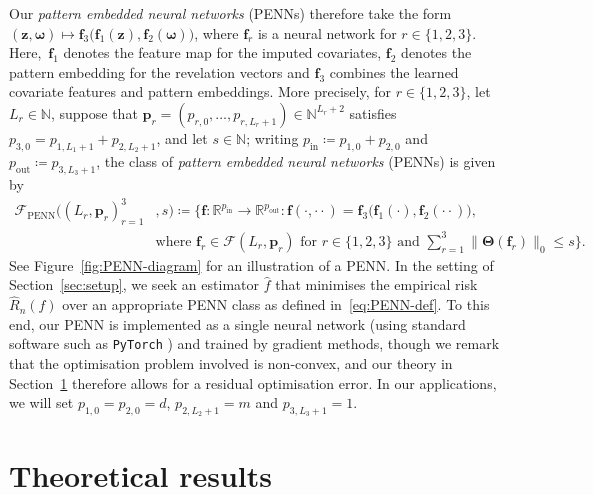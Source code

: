 \documentclass[12pt]{article}
\def\hat{\widehat}
\begin{document}
Our \emph{pattern embedded neural networks} (PENNs) therefore take the form $(\bm z,\bm \omega) \mapsto \bm f_3\bigl(\bm f_1(\bm z), \bm f_2(\bm\omega)\bigr)$, where $\bm f_r$ is a neural network for $r \in \{1,2,3\}$.  Here,~$\bm f_1$ denotes the feature map for the imputed covariates, $\bm f_2$ denotes the pattern embedding  for the revelation vectors and $\bm f_3$ combines the learned covariate features and pattern embeddings.  More precisely, for $r \in \{1,2,3\}$, let $L_r \in \mathbb{N}$, suppose that $\bm p_r = (p_{r,0},\ldots,p_{r,L_r+1}) \in \mathbb{N}^{L_r+2}$ satisfies $p_{3,0} = p_{1,L_1+1} + p_{2,L_2+1}$, and let $s\in\mathbb{N}$; writing $p_{\mathrm{in}} \coloneqq p_{1,0} + p_{2,0}$ and $p_{\mathrm{out}} \coloneqq p_{3,L_3+1}$, the class of \emph{pattern embedded neural networks} (PENNs) is given by
\begin{align}
\mathcal{F}_{\mathrm{PENN}}\bigl((L_r,\bm{p}_r)_{r=1}^3 &,s\bigr) \coloneqq \biggl\{ \bm f : \mathbb{R}^{p_{\mathrm{in}}} \to \mathbb{R}^{p_{\mathrm{out}}} : \bm f(\cdot,\cdot\cdot) = \bm f_3\bigl(\bm f_1(\cdot), \bm f_2(\cdot\cdot)\bigr), \nonumber \\
        & \text{where } \bm f_r \in \mathcal{F}(L_r,\bm p_r) \text{ for } r\in\{1,2,3\} \text{ and } \sum_{r=1}^3 \|\bm\Theta(\bm f_r)\|_0 \leq s \biggr\}. \label{eq:PENN-def}
\end{align}
See Figure~\ref{fig:PENN-diagram} for an illustration of a PENN.  In the setting of Section~\ref{sec:setup}, we seek an estimator $\hat{f}$ that minimises the empirical risk $\hat{R}_n(f)$ over an appropriate PENN class as defined in~\eqref{eq:PENN-def}.  To this end, our PENN is implemented as a single neural network (using standard software such as \texttt{PyTorch} \citep{paszke2019pytorch}) and trained by gradient methods, though we remark that the optimisation problem involved is non-convex, and our theory in Section~\ref{sec:theoretical-results} therefore allows for a residual optimisation error.  In our applications, we will set $p_{1,0} = p_{2,0} = d$, $p_{2,L_2+1} = m$ and $p_{3,L_3+1} = 1$.  %



\section{Theoretical results} \label{sec:theoretical-results}
\end{document}
